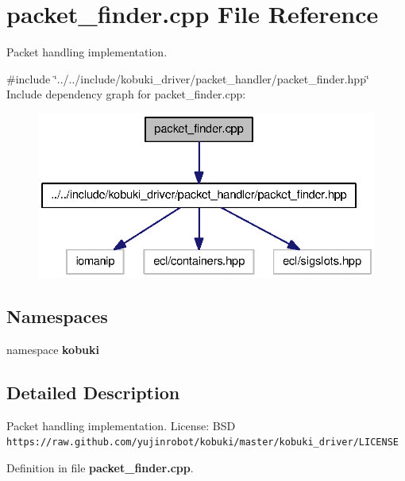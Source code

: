 \section{packet\-\_\-finder.\-cpp \-File \-Reference}
\label{packet__finder_8cpp}


\-Packet handling implementation.  


{\ttfamily \#include \char`\"{}../../include/kobuki\-\_\-driver/packet\-\_\-handler/packet\-\_\-finder.\-hpp\char`\"{}}\*
\-Include dependency graph for packet\-\_\-finder.\-cpp\-:
\nopagebreak
\begin{figure}[H]
\begin{center}
\leavevmode
\includegraphics[width=331pt]{packet__finder_8cpp__incl}
\end{center}
\end{figure}
\subsection*{\-Namespaces}
\begin{DoxyCompactItemize}
\item 
namespace {\bf kobuki}
\end{DoxyCompactItemize}


\subsection{\-Detailed \-Description}
\-Packet handling implementation. \-License\-: \-B\-S\-D {\tt https\-://raw.\-github.\-com/yujinrobot/kobuki/master/kobuki\-\_\-driver/\-L\-I\-C\-E\-N\-S\-E} 

\-Definition in file {\bf packet\-\_\-finder.\-cpp}.

